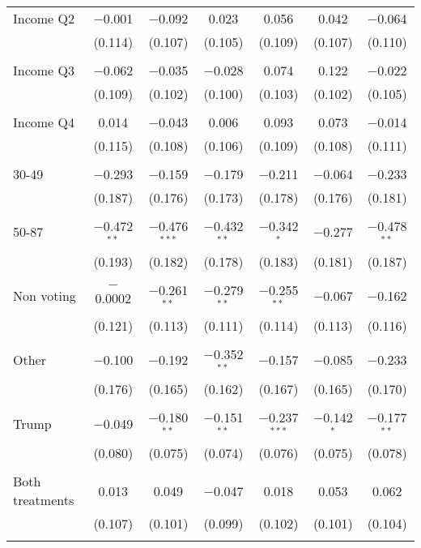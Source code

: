 \begin{tabular}{@{\extracolsep{5pt}}lcccccc}
 Income Q2 & $-$0.001 & $-$0.092 & 0.023 & 0.056 & 0.042 & $-$0.064 \\ 
  & (0.114) & (0.107) & (0.105) & (0.109) & (0.107) & (0.110) \\ 
  & & & & & & \\ 
 Income Q3 & $-$0.062 & $-$0.035 & $-$0.028 & 0.074 & 0.122 & $-$0.022 \\ 
  & (0.109) & (0.102) & (0.100) & (0.103) & (0.102) & (0.105) \\ 
  & & & & & & \\ 
 Income Q4 & 0.014 & $-$0.043 & 0.006 & 0.093 & 0.073 & $-$0.014 \\ 
  & (0.115) & (0.108) & (0.106) & (0.109) & (0.108) & (0.111) \\ 
  & & & & & & \\ 
 30-49 & $-$0.293 & $-$0.159 & $-$0.179 & $-$0.211 & $-$0.064 & $-$0.233 \\ 
  & (0.187) & (0.176) & (0.173) & (0.178) & (0.176) & (0.181) \\ 
  & & & & & & \\ 
 50-87 & $-$0.472$^{**}$ & $-$0.476$^{***}$ & $-$0.432$^{**}$ & $-$0.342$^{*}$ & $-$0.277 & $-$0.478$^{**}$ \\ 
  & (0.193) & (0.182) & (0.178) & (0.183) & (0.181) & (0.187) \\ 
  & & & & & & \\ 
 Non voting & $-$0.0002 & $-$0.261$^{**}$ & $-$0.279$^{**}$ & $-$0.255$^{**}$ & $-$0.067 & $-$0.162 \\ 
  & (0.121) & (0.113) & (0.111) & (0.114) & (0.113) & (0.116) \\ 
  & & & & & & \\ 
 Other & $-$0.100 & $-$0.192 & $-$0.352$^{**}$ & $-$0.157 & $-$0.085 & $-$0.233 \\ 
  & (0.176) & (0.165) & (0.162) & (0.167) & (0.165) & (0.170) \\ 
  & & & & & & \\ 
 Trump & $-$0.049 & $-$0.180$^{**}$ & $-$0.151$^{**}$ & $-$0.237$^{***}$ & $-$0.142$^{*}$ & $-$0.177$^{**}$ \\ 
  & (0.080) & (0.075) & (0.074) & (0.076) & (0.075) & (0.078) \\ 
  & & & & & & \\ 
 Both treatments & 0.013 & 0.049 & $-$0.047 & 0.018 & 0.053 & 0.062 \\ 
  & (0.107) & (0.101) & (0.099) & (0.102) & (0.101) & (0.104) \\ 
  & & & & & & \\ 

\end{tabular}
